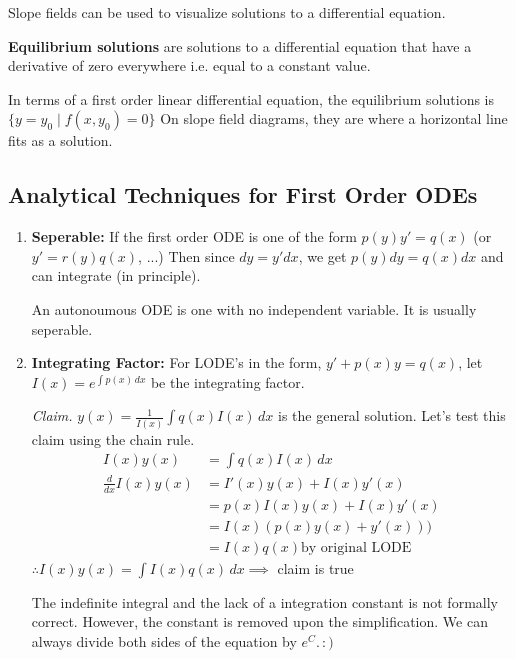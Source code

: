 \documentclass[../main.tex]{subfiles}
\begin{document}
\begin{note}
    Slope fields can be used to visualize solutions to a differential equation.
\end{note}

\begin{definition}
    \textbf{Equilibrium solutions} are solutions to a differential equation that have a derivative of zero everywhere i.e. equal to a constant value.
\end{definition}

In terms of a first order linear differential equation, the equilibrium solutions is \( \{ y = y_0 \mid f(x,y_0)=0 \} \)
On slope field diagrams, they are where a horizontal line fits as a solution.


\subsection{Analytical Techniques for First Order ODEs}

\begin{enumerate}[mode=unboxed]
    \item \textbf{Seperable:} If the first order ODE is one of the form \( p(y)y'=q(x) \) (or \( y'=r(y)q(x) \), ...)
        Then since \( dy=y'dx \), we get \( p(y)dy=q(x)dx \) and can integrate (in principle).
        \begin{definition}
            An autonoumous ODE is one with no independent variable. It is usually seperable.
        \end{definition}
    \item \textbf{Integrating Factor:} For LODE's in the form, \( y'+p(x)y=q(x) \), let \( I(x)= e^{\int p(x) \,dx} \) be the integrating factor.

        \textit{Claim.} \( y(x)= \frac{1}{I(x)}\int q(x) I(x) \,dx \) is the general solution.
        Let's test this claim using the chain rule.
        \begin{align*}
            I(x)y(x)&=\int q(x) I(x) \,dx \\
            \frac{d}{dx}I(x)y(x)&=I'(x)y(x)+I(x)y'(x) \\
            &= p(x)I(x)y(x)+I(x)y'(x) \\
            &= I(x)(p(x)y(x)+y'(x))) \\
            &= I(x)q(x) \text{by original LODE}
        \end{align*}
        \( \therefore I(x)y(x)=\int I(x)q(x) \,dx \implies\) claim is true 

        \begin{note}
            The indefinite integral and the lack of a integration constant is not formally correct.
            However, the constant is removed upon the simplification.
            We can always divide both sides of the equation by \( e^{C}.\, :) \)
        \end{note}
\end{enumerate}
\end{document}
